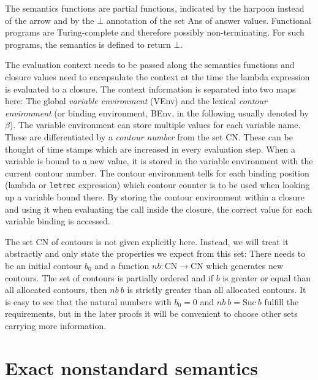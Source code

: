 \documentclass[a4paper,parskip=half,BCOR=8mm,DIV=calc,12pt]{scrbook}
\begin{document}
The semantics functions are partial functions, indicated by the harpoon instead of the arrow and by the $\bot$ annotation of the set Ans of answer values. Functional programs are Turing-complete and therefore possibly non-terminating. For such programs, the semantics is defined to return $\bot$.

The evaluation context needs to be passed along the semantics functions and closure values need to encapsulate the context at the time the lambda expression is evaluated to a closure. The context information is separated into two maps here: The global \textit{variable environment} (VEnv) and the lexical \textit{contour environment} (or binding environment, BEnv, in the following usually denoted by $\beta$). The variable environment can store multiple values for each variable name. These are differentiated by a \textit{contour number} from the set CN. These can be thought of time stamps which are increased in every evaluation step. When a variable is bound to a new value, it is stored in the variable environment with the current contour number. The contour environment tells for each binding position (lambda or \texttt{letrec} expression) which contour counter is to be used when looking up a variable bound there. By storing the contour environment within a closure and using it when evaluating the call inside the closure, the correct value for each variable binding is accessed.

The set CN of contours is not given explicitly here. Instead, we will treat it abstractly and only state the properties we expect from this set: There needs to be an initial contour $b_0$ and a function $nb \colon \text{CN} \to \text{CN}$ which generates new contours. The set of contours is partially ordered and if $b$ is greater or equal than all allocated contours, then $nb\ b$ is strictly greater than all allocated contours. It is easy to see that the natural numbers with $b_0 = 0$ and $nb\ b = \text{Suc}\ b$ fulfill the requirements, but in the later proofs it will be convenient to choose other sets carrying more information. 

\section{Exact nonstandard semantics}
\end{document}
